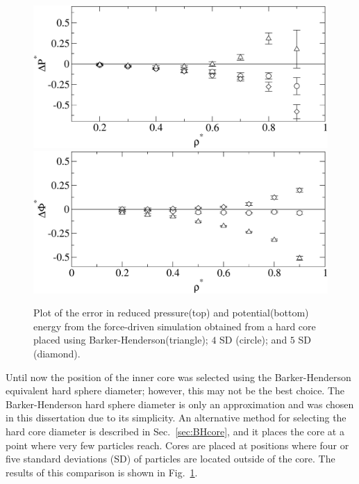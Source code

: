 \documentclass[12pt]{UoAthesis} \usepackage{booktabs}
\begin{document}
\begin{figure}[htp] 
  \begin{center}
    \includegraphics[clip,scale=0.45]{figures/coresP} 
    \includegraphics[clip,scale=0.45]{figures/coresU} 
    \caption [Comparison of the errors from the force-driven
    simulation of various hard core placement]
    {Plot of the error in reduced pressure(top) and potential(bottom)
      energy from the force-driven simulation obtained from a hard
      core placed using Barker-Henderson(triangle); $4$ SD (circle);
      and $5$ SD (diamond).}
    \label{fig:compCore}
  \end{center}
\end{figure}

Until now the position of the inner core was selected using the
Barker-Henderson equivalent hard sphere diameter; however, this may
not be the best choice.  The Barker-Henderson hard sphere diameter is
only an approximation and was chosen in this dissertation due to its
simplicity.  An alternative method for selecting the hard core
diameter is described in Sec.~\ref{sec:BHcore}, and it places the
core at a point where very few particles reach.  Cores are placed at
positions where four or five standard deviations (SD) of particles are
located outside of the core.  The results of this comparison is shown
in Fig.~\ref{fig:compCore}.
\end{document}
